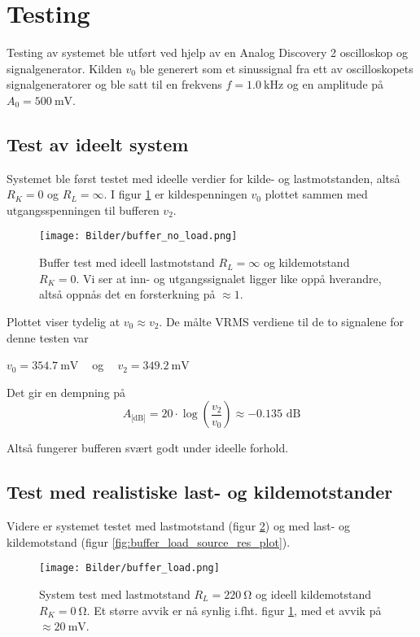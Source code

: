 \newpage
\section{Testing}

Testing av systemet ble utført ved hjelp av en Analog Discovery 2 \cite{analog_discovery} oscilloskop og 
signalgenerator. Kilden $v_0$ ble generert som et sinussignal fra ett av oscilloskopets signalgeneratorer 
og ble satt til en frekvens $f = \SI{1.0}{\kilo\hertz}$ og en amplitude på $A_0 = \SI{500}{\milli\volt}$.

\subsection{Test av ideelt system}
Systemet ble først testet med ideelle verdier for kilde- og lastmotstanden, altså
$R_K = 0$ og $R_L = \infty$. I figur \ref{fig:buffer_no_load_plot} er kildespenningen 
$v_0$ plottet sammen med utgangsspenningen til bufferen $v_2$.

\begin{figure}[H]
    \centering 
    \texttt{[image: Bilder/buffer\_no\_load.png]}
    \caption{Buffer test med ideell lastmotstand $R_L = \infty$ og kildemotstand $R_K = 0$. Vi ser at 
    inn- og utgangssignalet ligger like oppå hverandre, altså oppnås det en forsterkning på $\approx 1$.}
    \label{fig:buffer_no_load_plot}
\end{figure}

Plottet viser tydelig at $v_0 \approx v_2$. De målte VRMS verdiene til de to signalene for denne testen var 
\begin{center}
    $v_0 = \SI{354.7}{\milli\volt}\:\:\:\:$ og $\:\:\:\:v_2 = \SI{349.2}{\milli\volt}$ 
\end{center}

Det gir en dempning på
\[
    A_\text{[dB]} = 20 \cdot \log{\left(\frac{v_2}{v_0}\right)} \approx -0.135 \text{ dB}
\]

Altså fungerer bufferen svært godt under ideelle forhold.

\subsection{Test med realistiske last- og kildemotstander}
Videre er systemet testet med lastmotstand (figur \ref{fig:buffer_load_no_res_plot}) og med last- 
og kildemotstand (figur \ref{fig:buffer_load_source_res_plot}).

\begin{figure}[H]
    \centering 
    \texttt{[image: Bilder/buffer\_load.png]}
    \caption{System test med lastmotstand $R_L = \SI{220}{\ohm}$ og ideell kildemotstand $R_K = \SI{0}{\ohm}$. 
    Et større avvik er nå synlig i.fht. figur \ref{fig:buffer_no_load_plot}, med et avvik på 
    $\approx \SI{20}{\milli\volt}$.}
    \label{fig:buffer_load_no_res_plot}
\end{figure}

